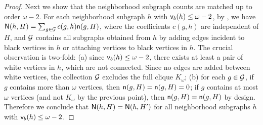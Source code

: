 \begin{proof}
Next we show that the neighborhood subgraph counts are matched up to order $\omega-2 $. 
For each neighborhood subgraph $ h $ with $ {\mathsf{v}}_b(h) \leq \omega-2 $, by , we have 
	${\mathsf{N}}(h,H) = \sum_{g \in {\mathcal{G}}} c(g,h) \mathsf{n}(g,H)$, where the coefficients $c(g,h)$ are independent of $H$, and ${\mathcal{G}}$ contains all subgraphs obtained from $h$ by adding edges incident to black vertices in $h$ or attaching vertices to black vertices in $h$.
	The crucial observation is two-fold:
	(a) since $ {\mathsf{v}}_b(h) \leq \omega-2 $, there exists at least a pair of white vertices in $h$, which are not connected. Since no edges are added between white vertices, the collection ${\mathcal{G}}$ excludes the full clique $K_\omega$;
	(b) for each $g\in {\mathcal{G}}$, if $g$ contains more than $\omega$ vertices, then $\mathsf{n}(g,H)=\mathsf{n}(g,H)=0$; if $g$ contains at most $\omega$ vertices (and not $K_\omega$ by the previous point), then $\mathsf{n}(g,H)=\mathsf{n}(g,H)$ by design.
	Therefore we conclude that 
$ {\mathsf{N}}(h, H) = {\mathsf{N}}(h, H') $ for all neighborhood subgraphs $ h $ with $ {\mathsf{v}}_b(h) \leq \omega-2 $. 
\end{proof}


